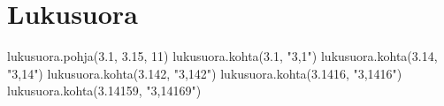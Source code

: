 \section{Lukusuora}
\begin{kuva}
lukusuora.pohja(3.1, 3.15, 11)
lukusuora.kohta(3.1, "3,1")
lukusuora.kohta(3.14, "3,14")
lukusuora.kohta(3.142, "3,142")
lukusuora.kohta(3.1416, "3,1416")
lukusuora.kohta(3.14159, "3,14169")
\end{kuva}
